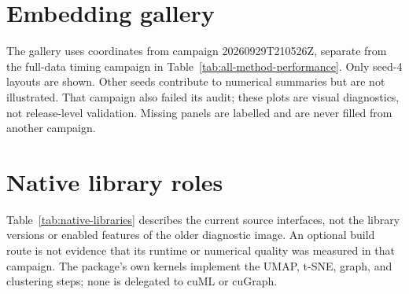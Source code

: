 \documentclass[article]{jss}
\begin{document}
\section{Embedding gallery}

The gallery uses coordinates from campaign 20260929T210526Z, separate
from the full-data timing campaign in
Table~\ref{tab:all-method-performance}. Only seed-4 layouts are
shown. Other seeds contribute to numerical summaries but are not
illustrated. That campaign also failed its audit; these plots are
visual diagnostics, not release-level validation. Missing panels are
labelled and are never filled from another campaign.



\section{Native library roles}

Table~\ref{tab:native-libraries} describes the current source interfaces,
not the library versions or enabled features of the older diagnostic image.
An optional build route is not evidence that its runtime or numerical quality
was measured in that campaign. The package's own kernels implement the UMAP,
t-SNE, graph, and clustering steps; none is delegated to cuML or cuGraph.
\end{document}
